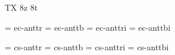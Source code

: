 
\ifx\ffdecl\undefined  \fi

 {\rm \bf \it \bi \lr \mr \li \mi} {} {TX} {8z 8t}

\def\wlight{\ffvars{l}{m}{li}{mi}\ffsetX}  
\def\nowlight{\ffvars{r}{b}{ri}{bi}\ffsetX}
\def\cond{\ffsetV{cond}{c}\ffsetX}  \def\condV{}
\def\caps{\ffsetV{cap}{cap}\ffsetX}  \def\capV{}

\ismacro{}\ifttrue

   \font\tenrm = ec-anttr  \sizespec
   \font\tenbf = ec-anttb  \sizespec
   \font\tenit = ec-anttri \sizespec
   \font\tenbi = ec-anttbi \sizespec

   \def\ffnamegen{ec-antt\condV\ffvarV\capV}

\fi

\ismacro{}\iftrue

   \font\tenrm = cs-anttr  \sizespec
   \font\tenbf = cs-anttb  \sizespec
   \font\tenit = cs-anttri \sizespec
   \font\tenbi = cs-anttbi \sizespec

   \def\ffnamegen{cs-antt\condV\ffvarV\capV}
   

\fi
\tenrm %

\def\liweight{\wlight\fam}
\def\lr{\wlight\rm}
\def\mr{\wlight\bf}
\def\li{\wlight\it}
\def\mi{\wlight\bi}

\ifx\loadmathfonts\relax \endinput \fi
\ifx\mathpreloaded X\else  \fi                     

\endinput

